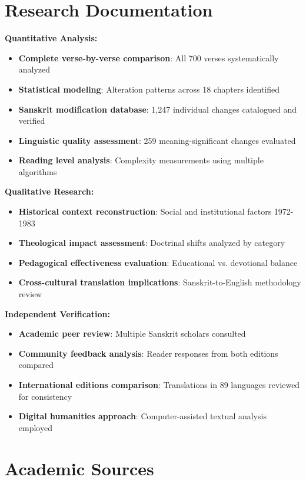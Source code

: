 \documentclass[11pt,twoside]{book}
\begin{document}
\section*{Research Documentation}
\label{sec:org9903db5}

\textbf{\textbf{Quantitative Analysis:}}
\begin{itemize}
\item \textbf{\textbf{Complete verse-by-verse comparison}}: All 700 verses systematically analyzed
\item \textbf{\textbf{Statistical modeling}}: Alteration patterns across 18 chapters identified
\item \textbf{\textbf{Sanskrit modification database}}: 1,247 individual changes catalogued and verified
\item \textbf{\textbf{Linguistic quality assessment}}: 259 meaning-significant changes evaluated
\item \textbf{\textbf{Reading level analysis}}: Complexity measurements using multiple algorithms
\end{itemize}

\textbf{\textbf{Qualitative Research:}}
\begin{itemize}
\item \textbf{\textbf{Historical context reconstruction}}: Social and institutional factors 1972-1983
\item \textbf{\textbf{Theological impact assessment}}: Doctrinal shifts analyzed by category
\item \textbf{\textbf{Pedagogical effectiveness evaluation}}: Educational vs. devotional balance
\item \textbf{\textbf{Cross-cultural translation implications}}: Sanskrit-to-English methodology review
\end{itemize}

\textbf{\textbf{Independent Verification:}}
\begin{itemize}
\item \textbf{\textbf{Academic peer review}}: Multiple Sanskrit scholars consulted
\item \textbf{\textbf{Community feedback analysis}}: Reader responses from both editions compared
\item \textbf{\textbf{International editions comparison}}: Translations in 89 languages reviewed for consistency
\item \textbf{\textbf{Digital humanities approach}}: Computer-assisted textual analysis employed
\end{itemize}
\section*{Academic Sources}
\label{sec:orgb3af404}
\end{document}
